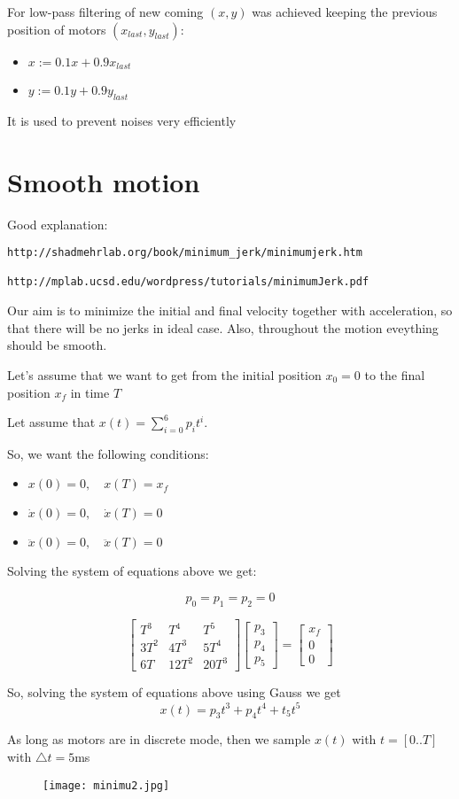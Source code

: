 \documentclass{article}
\begin{document}
For low-pass filtering of new coming $(x, y)$ was achieved keeping the previous position of motors $(x_{last}, y_{last})$:
\begin{itemize}
\item $x := 0.1x  + 0.9x_{last}$
\item $	y := 0.1y  + 0.9y_{last}$
\end{itemize}
	
It is used to prevent noises very efficiently


\section{Smooth motion}

Good explanation:

\begin{verbatim}
http://shadmehrlab.org/book/minimum_jerk/minimumjerk.htm

http://mplab.ucsd.edu/wordpress/tutorials/minimumJerk.pdf

\end{verbatim}



Our aim is to minimize the initial and final velocity together with acceleration, so that there will be no jerks in ideal case. Also, throughout the motion eveything should be smooth.

Let's assume that we want to get from the initial position $x_0=0$ to the final position $x_f$ in time $T$

Let assume that $x(t)=\displaystyle \sum_{i=0}^{6} p_it^i$.

So, we want the following conditions:
\begin{itemize}
\item $x(0) = 0, \quad x(T)=x_f$
\item $\dot{x}(0) = 0, \quad \dot{x}(T)=0$
\item $\ddot{x}(0) = 0, \quad \ddot{x}(T)=0$
\end{itemize}

Solving the system of equations above we get:

\[p_0 = p_1 = p_2 = 0\]

\[
\begin{bmatrix}
    T^3    & T^4 & T^5  \\
    3T^2  & 4T^3 & 5T^4  \\
    6T   & 12T^2 & 20T^3 
\end{bmatrix}
\begin{bmatrix}
p_3 \\
p_4 \\
p_5
\end{bmatrix}
=
\begin{bmatrix}
x_f \\
0 \\
0
\end{bmatrix}
\]

So, solving the system of equations above using Gauss we get
\[x(t) = p_3t^3 + p_4t^4 + t_5t^5\]

As long as motors are in discrete mode, then we sample $x(t)$ with $t=[0..T]$ with $\triangle t = 5$ms

\begin{figure}
\texttt{[image: minimu2.jpg]}
\label{fig:univerise}
\end{figure}
\end{document}

